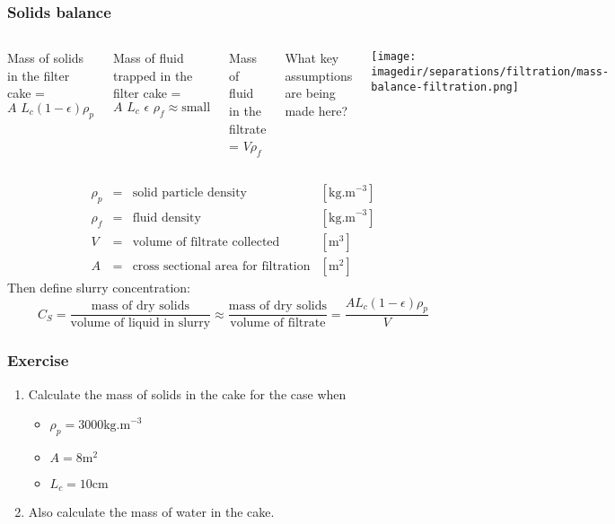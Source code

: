 \begin{frame}\frametitle{Solids balance}
	\begin{columns}[t]
			Mass of solids in the filter cake = {\color{brown}$A \,\,L_c\left(1-\epsilon\right)\rho_p$}
			
			\vspace{5pt}
			Mass of fluid trapped in the filter cake = {\color{myOrange}$A \,\,L_c\,\, \epsilon \,\,\rho_f \approx \text{small}$}
			
			\vspace{5pt}
			Mass of fluid in the filtrate = {\color{blue}$V \rho_f$}
			
			\vspace{5pt}
			{\scriptsize \color{red}What key assumptions are being made here?}
			
			\vspace{-48pt}
			\begin{center}
				\texttt{[image: \\imagedir/separations/filtration/mass-balance-filtration.png]}
			\end{center}
			
	\end{columns}
	\vspace{1pt}
	\[
		\begin{array}{rcll}
			\rho_p  &=& \text{solid particle density}				&[\text{kg.m}^{-3}]\\
			\rho_f  &=& \text{fluid density}						&[\text{kg.m}^{-3}]\\
			V		&=& \text{volume of filtrate collected} 		&[\text{m}^3]\\
			A		&=& \text{cross sectional area for filtration}  &[\text{m}^2]
		\end{array}
	\]
	Then define {\color{purple}slurry concentration}: \\
	\[ C_S = \dfrac{\text{mass of dry solids}}{\text{volume of liquid in slurry}}  \approx \dfrac{\text{mass of dry solids}}{\text{volume of filtrate}} = \dfrac{A L_c \left(1-\epsilon\right)\rho_p}{V} \]
\end{frame}

\begin{frame}\frametitle{Exercise}
	\begin{enumerate}
		\item	Calculate the mass of solids in the cake for the case when
		\begin{itemize}
			\item	$\rho_p = 3000 \text{kg.m}^{-3}$
			\item	$A = 8 \text{m}^2$ 
			\item	$L_c = 10 \text{cm}$ 
		\end{itemize}

		\item	Also calculate the mass of water in the cake.
	\end{enumerate}
\end{frame}

